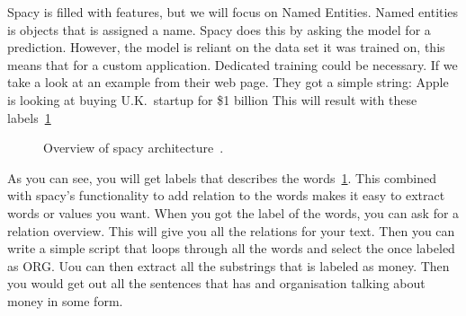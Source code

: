 Spacy is filled with features, but we will focus on Named Entities.
Named entities is objects that is assigned a name.
Spacy does this by asking the model for a prediction.
However, the model is reliant on the data set it was trained on, this means that for a custom application.
Dedicated training could be necessary.
If we take a look at an example from their web page.
They got a simple string: Apple is looking at buying U.K.\ startup for \$1 billion
This will result with these labels~\ref{fig:Spacy labels}

\begin{figure}[h]
    \caption{Overview of spacy architecture~\cite{spaCy101}.}
    \label{fig:Spacy labels}
\end{figure}

As you can see, you will get labels that describes the words~\ref{fig:Spacy labels}.
This combined with spacy's functionality to add relation to the words makes it easy to extract words or values you want.
When you got the label of the words, you can ask for a relation overview.
This will give you all the relations for your text.
Then you can write a simple script that loops through all the words and select the once labeled as ORG. Uou can then extract all the substrings that is labeled as money.
Then you would get out all the sentences that has and organisation talking about money in some form. 







